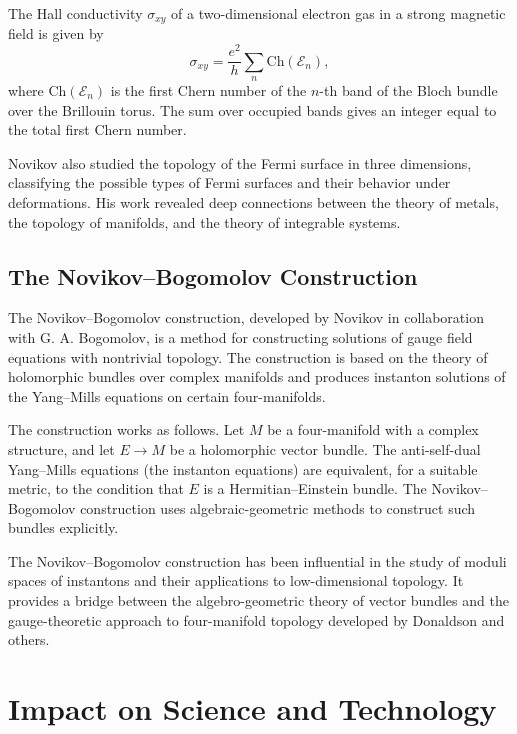 \begin{theorem}
The Hall conductivity \(\sigma_{xy}\) of a two-dimensional electron gas in a strong magnetic field is given by
\[
\sigma_{xy} = \frac{e^2}{h} \sum_{n} \text{Ch}(\mathcal{E}_n),
\]
where \(\text{Ch}(\mathcal{E}_n)\) is the first Chern number of the \(n\)-th band of the Bloch bundle over the Brillouin torus. The sum over occupied bands gives an integer equal to the total first Chern number.
\end{theorem}

Novikov also studied the topology of the Fermi surface in three dimensions, classifying the possible types of Fermi surfaces and their behavior under deformations. His work revealed deep connections between the theory of metals, the topology of manifolds, and the theory of integrable systems.

\subsection{The Novikov--Bogomolov Construction}

The Novikov--Bogomolov construction, developed by Novikov in collaboration with G. A. Bogomolov, is a method for constructing solutions of gauge field equations with nontrivial topology. The construction is based on the theory of holomorphic bundles over complex manifolds and produces instanton solutions of the Yang--Mills equations on certain four-manifolds.

The construction works as follows. Let \(M\) be a four-manifold with a complex structure, and let \(E \to M\) be a holomorphic vector bundle. The anti-self-dual Yang--Mills equations (the instanton equations) are equivalent, for a suitable metric, to the condition that \(E\) is a Hermitian--Einstein bundle. The Novikov--Bogomolov construction uses algebraic-geometric methods to construct such bundles explicitly.

The Novikov--Bogomolov construction has been influential in the study of moduli spaces of instantons and their applications to low-dimensional topology. It provides a bridge between the algebro-geometric theory of vector bundles and the gauge-theoretic approach to four-manifold topology developed by Donaldson and others.

\section{Impact on Science and Technology}

